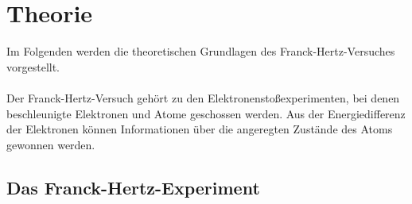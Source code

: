 \section{Theorie}

    Im Folgenden werden die theoretischen Grundlagen des Franck-Hertz-Versuches vorgestellt.\\
    \\
    Der Franck-Hertz-Versuch gehört zu den Elektronenstoßexperimenten,
    bei denen beschleunigte Elektronen und Atome geschossen werden.
    Aus der Energiedifferenz der Elektronen können Informationen über die angeregten Zustände des Atoms gewonnen werden.

\subsection{Das Franck-Hertz-Experiment}
\label{sec:grundprinzip}

